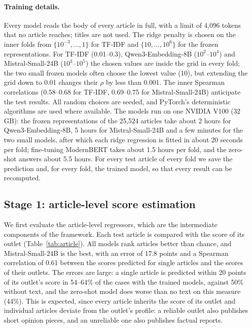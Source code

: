 \documentclass[11pt,a4paper]{article}
\begin{document}
\paragraph{Training details.}
Every model reads the body of every article in full, with a limit of 4,096 tokens that no article reaches; titles are
not used. The ridge penalty is
chosen on the inner folds from $\{10^{-3}, \ldots, 1\}$ for TF-IDF and $\{10, \ldots, 10^6\}$ for the frozen
representations. For TF-IDF (0.01--0.3), Qwen3-Embedding-8B ($10^2$--$10^4$) and Mistral-Small-24B ($10^3$--$10^5$) the
chosen values are inside the grid in every fold; the two small frozen models often choose the lowest value (10), but
extending the grid down to 0.01 changes their $\rho$ by less than 0.001. The inner Spearman correlations (0.58--0.68 for
TF-IDF, 0.69--0.75 for Mistral-Small-24B) anticipate the test results. All random choices are seeded, and PyTorch's deterministic algorithms are used where available. The models run on one NVIDIA V100 (32 GB): the frozen representations of the 25,524
articles take about 2 hours for Qwen3-Embedding-8B, 5 hours for Mistral-Small-24B and a few minutes for the two small
models, after which each ridge regression is fitted in about 20 seconds per fold; fine-tuning ModernBERT takes about
1.5 hours per fold, and the zero-shot answers about 5.5 hours. For every test article of every fold we save the
prediction and, for every fold, the trained model, so that every result can be recomputed.

\subsection{Stage 1: article-level score estimation}\label{sec:stage1}
We first evaluate the article-level regressors, which are the intermediate components of the framework. Each test
article is compared with the score of its outlet (Table~\ref{tab:article}). All models rank articles better than
chance, and Mistral-Small-24B is the best, with an error of 17.8 points and a Spearman correlation of 0.61 between the
scores predicted for single articles and the scores of their outlets. The errors are large: a single article is
predicted within 20 points of its outlet's score in 54--64\% of the cases with the trained models, against 50\% without
text, and the zero-shot model does worse than no text on this measure (44\%). This is expected, since every article
inherits the score of its outlet and individual articles deviate from the outlet's profile: a reliable outlet also
publishes short opinion pieces, and an unreliable one also publishes factual reports.
\end{document}

